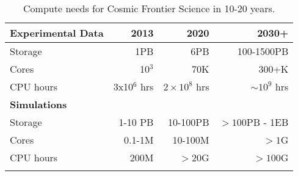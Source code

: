 \begin{center}
\begin{table}
\begin{tabular}{|l|r|r|r|} 
 \hline 
{\bf Experimental Data} & 2013 & 2020 & 2030+ \\
\hline
Storage & 1PB & 6PB & 100-1500PB \\
Cores & 10$^3$ & 70K & 300+K \\
CPU hours & 3x10$^6$ hrs & $2\times 10^8$ hrs & $\sim 10^9$ hrs \\
{\bf Simulations} &&& \\
Storage & 1-10 PB & 10-100PB & $> 100$PB - 1EB\\
Cores & 0.1-1M & 10-100M &$> 1$G\\
CPU hours & 200M & $>$20G & $> 100$G\\
\hline
\label{tab:CompNeeds}
\end{tabular}
\caption{Compute needs for Cosmic Frontier Science in 10-20 years.}
\end{table}
\end{center}

